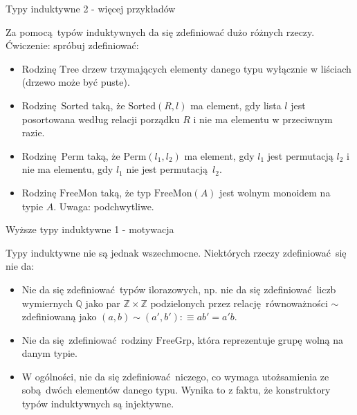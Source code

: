 \documentclass{beamer}
\newcommand{\defn}{:\equiv}
\begin{document}
\begin{frame}{Typy induktywne 2 - więcej przykładów}

Za pomocą typów induktywnych da się zdefiniować dużo różnych rzeczy. Ćwiczenie: spróbuj zdefiniować:
\begin{itemize}
	\item Rodzinę $\text{Tree}$ drzew trzymających elementy danego typu wyłącznie w liściach (drzewo może być puste).
	\item Rodzinę $\text{Sorted}$ taką, że $\text{Sorted}(R, l)$ ma element, gdy lista $l$ jest posortowana według relacji porządku $R$ i nie ma elementu w przeciwnym razie.
	\item Rodzinę $\text{Perm}$ taką, że $\text{Perm}(l_1, l_2)$ ma element, gdy $l_1$ jest permutacją $l_2$ i nie ma elementu, gdy $l_1$ nie jest permutacją $l_2$.
	\item Rodzinę $\text{FreeMon}$ taką, że typ $\text{FreeMon}(A)$ jest wolnym monoidem na typie $A$. Uwaga: podchwytliwe.
\end{itemize}
\end{frame}

\begin{frame}{Wyższe typy induktywne 1 - motywacja}

Typy induktywne nie są jednak wszechmocne. Niektórych rzeczy zdefiniować się nie da:
\begin{itemize}
	\item Nie da się zdefiniować typów ilorazowych, np. nie da się zdefiniować liczb wymiernych $\mathbb{Q}$ jako par $\mathbb{Z} \times \mathbb{Z}$ podzielonych przez relację równoważności $\sim$ zdefiniowaną jako $(a, b) \sim (a', b') \defn ab' = a'b$.
	\item Nie da się zdefiniować rodziny $\text{FreeGrp}$, która reprezentuje grupę wolną na danym typie.
	\item W ogólności, nie da się zdefiniować niczego, co wymaga utożsamienia ze sobą dwóch elementów danego typu. Wynika to z faktu, że konstruktory typów induktywnych są injektywne.
\end{itemize}
\end{frame}
\end{document}
